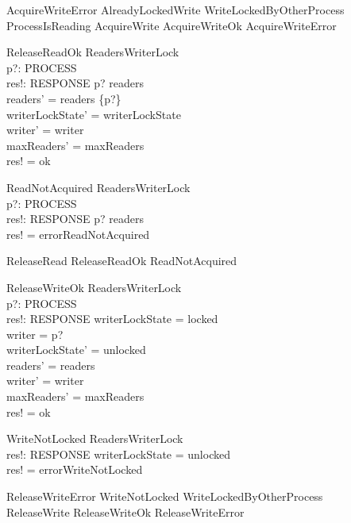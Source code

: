 \documentclass{article}
\begin{document}
\begin{zed}
AcquireWriteError  AlreadyLockedWrite \lor WriteLockedByOtherProcess \\ \quad \lor ProcessIsReading 
\also
AcquireWrite  AcquireWriteOk \lor AcquireWriteError 
\end{zed}

\begin{schema}{ReleaseReadOk}
    \Delta ReadersWriterLock \\
    p?: PROCESS \\
    res!: RESPONSE
\where
    p? \in readers \\
    readers' = readers \setminus \{p?\} \\
    writerLockState' = writerLockState \\
    writer' = writer \\
    maxReaders' = maxReaders \\
    res! = ok
\end{schema}

\begin{schema}{ReadNotAcquired}
    \Xi ReadersWriterLock \\
    p?: PROCESS \\
    res!: RESPONSE
\where
    p? \notin readers \\
    res! = errorReadNotAcquired
\end{schema}

\begin{zed}
ReleaseRead  ReleaseReadOk \lor ReadNotAcquired
\end{zed}

\begin{schema}{ReleaseWriteOk}
    \Delta ReadersWriterLock \\
    p?: PROCESS \\
    res!: RESPONSE
\where
    writerLockState = locked \\
    writer = p? \\
    writerLockState' = unlocked \\
    readers' = readers \\
    writer' = writer \\
    maxReaders' = maxReaders \\
    res! = ok
\end{schema}

\begin{schema}{WriteNotLocked}
    \Xi ReadersWriterLock \\
    res!: RESPONSE
\where
    writerLockState = unlocked \\
    res! = errorWriteNotLocked
\end{schema}

\begin{zed}
ReleaseWriteError  WriteNotLocked \lor WriteLockedByOtherProcess 
\\
ReleaseWrite  ReleaseWriteOk \lor ReleaseWriteError
\end{zed}
\end{document}
